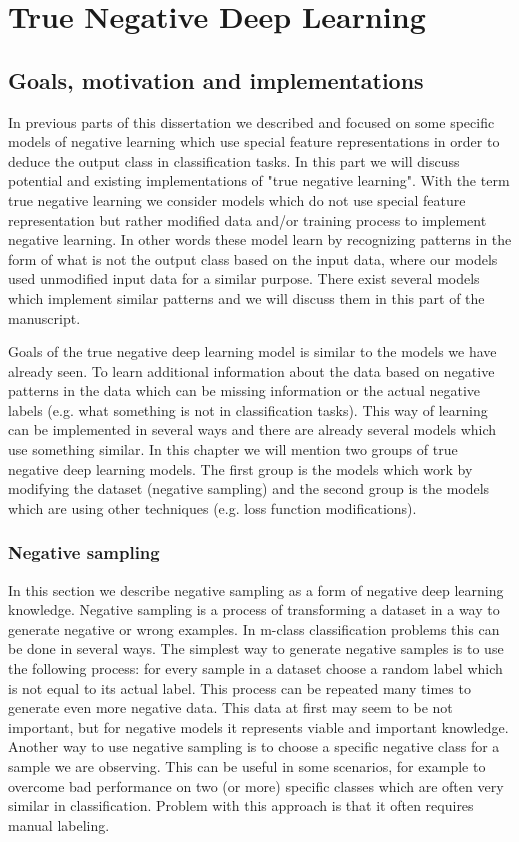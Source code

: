 \documentclass[b5paper]{book}
\begin{document}
\part{True Negative Deep Learning}
\chapter{Goals, motivation and implementations}
In previous parts of this dissertation we described and focused on some specific models of negative learning which use special feature representations in order to deduce the output class in classification tasks. In this part we will discuss potential and existing implementations of "true negative learning". With the term true negative learning we consider models which do not use special feature representation but rather modified data and/or training process to implement negative learning. In other words these model learn by recognizing patterns in the form of what is not the output class based on the input data, where our models used unmodified input data for a similar purpose. There exist several models which implement similar patterns and we will discuss them in this part of the manuscript.

Goals of the true negative deep learning model is similar to the models we have already seen. To learn additional information about the data based on negative patterns in the data which can be missing information or the actual negative labels (e.g. what something is not in classification tasks). This way of learning can be implemented in several ways and there are already several models which use something similar. In this chapter we will mention two groups of true negative deep learning models. The first group is the models which work by modifying the dataset (negative sampling) and the second group is the models which are using other techniques (e.g. loss function modifications).

\section{Negative sampling}

In this section we describe negative sampling as a form of negative deep learning knowledge. Negative sampling is a process of transforming a dataset in a way to generate negative or wrong examples. In m-class classification problems this can be done in several ways. The simplest way to generate negative samples is to use the following process: for every sample in a dataset choose a random label which is not equal to its actual label. This process can be repeated many times to generate even more negative data. This data at first may seem to be not important, but for negative models it represents viable and important knowledge. Another way to use negative sampling is to choose a specific negative class for a sample we are observing. This can be useful in some scenarios, for example to overcome bad performance on two (or more) specific classes which are often very similar in classification. Problem with this approach is that it often requires manual labeling.
\end{document}
